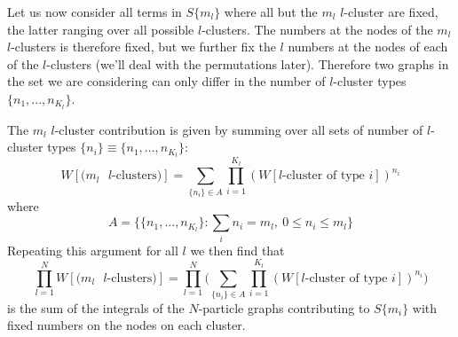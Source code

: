 \documentclass[a4paper,11pt,oneside]{book}
\begin{document}
Let us now consider all terms in $S\{m_l\}$ where all but the $m_l$ $l$-cluster are fixed, the latter ranging over all possible $l$-clusters. The numbers at the nodes of the $m_l$ $l$-clusters is therefore fixed, but we further fix the $l$ numbers at the nodes of each of the $l$-clusters (we'll deal with the permutations later). Therefore two graphs in the set we are considering can only differ in the number of $l$-cluster types $\{n_1,...,n_{K_l}\}$.


The $m_l$ $l$-cluster contribution is given by summing over all sets of number of $l$-cluster types $\{n_i\} \equiv \{n_1,...,n_{K_l}\}$:
\begin{equation}
      W[\text{($m_l$ $l$-clusters)}]  = \sum_{\{n_i\} \in A} \prod_{i=1}^{K_l} (W[\text{$l$-cluster of type $i$}])^{n_i}
\end{equation}
where
\begin{equation}
    A = \Big\{\{n_1,...,n_{K_l}\}:\sum_i n_i = m_l, \ 0 \leq n_i \leq m_l\Big\}
\end{equation}
Repeating this argument for all $l$ we then find that
\begin{equation}\label{fixed n}
    \prod_{l=1}^N W[\text{($m_l$ $l$-clusters)}]=\prod_{l=1}^N\bigg(\sum_{\{n_i\} \in A} \prod_{i=1}^{K_l} (W[\text{$l$-cluster of type $i$}])^{n_i}\bigg)
\end{equation}
is the sum of the integrals of the $N$-particle graphs contributing to $S\{m_i\}$ with fixed numbers on the nodes on each cluster.
\end{document}

